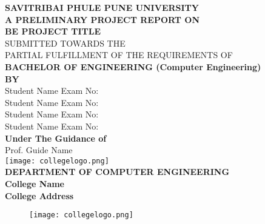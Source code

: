 \documentclass[oneside,a4paper,12pt]{report}
\begin{document}
\setlength{\parindent}{0mm}
\begin{center}
{\bfseries SAVITRIBAI PHULE PUNE UNIVERSITY \\}
 \vspace*{1\baselineskip}
{\bfseries A PRELIMINARY PROJECT REPORT ON \\}
 \vspace*{2\baselineskip}
{\bfseries \fontsize{16}{12} \selectfont BE PROJECT TITLE \\ \vspace*{2\baselineskip}}
{\fontsize{12}{12} \selectfont SUBMITTED TOWARDS THE
 \\PARTIAL FULFILLMENT OF THE REQUIREMENTS OF \\

\vspace*{2\baselineskip}}
{\bfseries \fontsize{14}{12} \selectfont BACHELOR OF ENGINEERING (Computer
Engineering) \\
\vspace*{1\baselineskip}} 
{\bfseries \fontsize{14}{12} \selectfont BY \\ 
\vspace*{1\baselineskip}} 
Student Name  \hspace{25 mm} Exam No:  \\
Student Name \hspace{25 mm} Exam No:   \\
Student Name \hspace{25 mm} Exam No:  \\
Student Name \hspace{25 mm} Exam No:\\
\vspace*{2\baselineskip}
{\bfseries \fontsize{14}{12} \selectfont Under The Guidance of \\  
\vspace*{2\baselineskip}} 
Prof. Guide Name\\
\texttt{[image: collegelogo.png]} \\
{\bfseries \fontsize{14}{12} \selectfont DEPARTMENT OF COMPUTER ENGINEERING \\
College Name \\
College Address 
}
\end{center}

\newpage



\begin{figure}[ht]
\centering
\texttt{[image: collegelogo.png]}
\end{figure}
\end{document}
